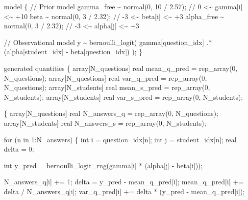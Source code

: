 \documentclass[
  letterpaper,
  DIV=11,
  numbers=noendperiod]{scrartcl}
\newenvironment{Shaded}{\begin{snugshade}}{\end{snugshade}}
\newcommand{\CommentTok}[1]{\textcolor[rgb]{0.37,0.37,0.37}{#1}}
\newcommand{\ControlFlowTok}[1]{\textcolor[rgb]{0.00,0.23,0.31}{#1}}
\newcommand{\DataTypeTok}[1]{\textcolor[rgb]{0.68,0.00,0.00}{#1}}
\newcommand{\DecValTok}[1]{\textcolor[rgb]{0.68,0.00,0.00}{#1}}
\newcommand{\FloatTok}[1]{\textcolor[rgb]{0.68,0.00,0.00}{#1}}
\newcommand{\KeywordTok}[1]{\textcolor[rgb]{0.00,0.23,0.31}{#1}}
\newcommand{\NormalTok}[1]{\textcolor[rgb]{0.00,0.23,0.31}{#1}}
\begin{document}
\begin{codelisting}
\begin{Shaded}
\begin{Highlighting}[]
\KeywordTok{model}\NormalTok{ \{}
  \CommentTok{// Prior model}
\NormalTok{  gamma\_free \textasciitilde{} normal(}\DecValTok{0}\NormalTok{, }\DecValTok{10}\NormalTok{ / }\FloatTok{2.57}\NormalTok{); }\CommentTok{// 0 \textless{}\textasciitilde{} gamma[i] \textless{}\textasciitilde{} +10}
\NormalTok{  beta       \textasciitilde{} normal(}\DecValTok{0}\NormalTok{, }\DecValTok{3}\NormalTok{ / }\FloatTok{2.32}\NormalTok{);  }\CommentTok{// {-}3 \textless{}\textasciitilde{}  beta[i] \textless{}\textasciitilde{} +3}
\NormalTok{  alpha\_free \textasciitilde{} normal(}\DecValTok{0}\NormalTok{, }\DecValTok{3}\NormalTok{ / }\FloatTok{2.32}\NormalTok{);  }\CommentTok{// {-}3 \textless{}\textasciitilde{} alpha[j] \textless{}\textasciitilde{} +3}

  \CommentTok{// Observational model}
\NormalTok{  y \textasciitilde{} bernoulli\_logit(   gamma[question\_idx]}
\NormalTok{                      .* (alpha[student\_idx] {-} beta[question\_idx]) );}
\NormalTok{\}}

\KeywordTok{generated quantities}\NormalTok{ \{}
  \DataTypeTok{array}\NormalTok{[N\_questions] }\DataTypeTok{real}\NormalTok{ mean\_q\_pred = rep\_array(}\DecValTok{0}\NormalTok{, N\_questions);}
  \DataTypeTok{array}\NormalTok{[N\_questions] }\DataTypeTok{real}\NormalTok{ var\_q\_pred  = rep\_array(}\DecValTok{0}\NormalTok{, N\_questions);}
  \DataTypeTok{array}\NormalTok{[N\_students]  }\DataTypeTok{real}\NormalTok{ mean\_s\_pred = rep\_array(}\DecValTok{0}\NormalTok{, N\_students);}
  \DataTypeTok{array}\NormalTok{[N\_students]  }\DataTypeTok{real}\NormalTok{ var\_s\_pred  = rep\_array(}\DecValTok{0}\NormalTok{, N\_students);}

\NormalTok{  \{}
    \DataTypeTok{array}\NormalTok{[N\_questions] }\DataTypeTok{real}\NormalTok{ N\_answers\_q = rep\_array(}\DecValTok{0}\NormalTok{, N\_questions);}
    \DataTypeTok{array}\NormalTok{[N\_students]  }\DataTypeTok{real}\NormalTok{ N\_answers\_s = rep\_array(}\DecValTok{0}\NormalTok{, N\_students);}

    \ControlFlowTok{for}\NormalTok{ (n }\ControlFlowTok{in} \DecValTok{1}\NormalTok{:N\_answers) \{}
      \DataTypeTok{int}\NormalTok{ i = question\_idx[n];}
      \DataTypeTok{int}\NormalTok{ j = student\_idx[n];}
      \DataTypeTok{real}\NormalTok{ delta = }\DecValTok{0}\NormalTok{;}

      \DataTypeTok{int}\NormalTok{ y\_pred = bernoulli\_logit\_rng(gamma[i] * (alpha[j] {-} beta[i]));}

\NormalTok{      N\_answers\_q[i] += }\DecValTok{1}\NormalTok{;}
\NormalTok{      delta = y\_pred {-} mean\_q\_pred[i];}
\NormalTok{      mean\_q\_pred[i] += delta / N\_answers\_q[i];}
\NormalTok{      var\_q\_pred[i] += delta * (y\_pred {-} mean\_q\_pred[i]);}


\end{Highlighting}
\end{Shaded}
\end{codelisting}
\end{document}
